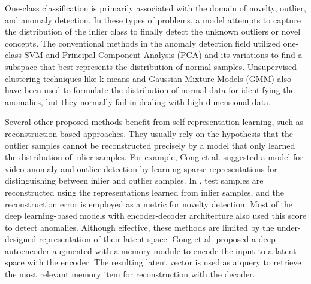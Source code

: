 \documentclass[10pt,twocolumn,letterpaper]{article}
\begin{document}
One-class classification is primarily associated with the domain of novelty, outlier, and anomaly detection. In these types of problems, a model attempts to capture the distribution of the inlier class to finally detect the unknown outliers or novel concepts. The conventional methods in the anomaly detection field utilized one-class SVM \cite{scholkopf2002learning, hayton2000support} and Principal Component Analysis (PCA) and its variations \cite{bishop2006pattern, hoffmann2007kernel} to find a subspace that best represents the distribution of normal samples. Unsupervised clustering techniques like k-means \cite{zimek2012survey} and Gaussian Mixture Models (GMM) \cite{xiong2011group} also have been used to formulate the distribution of normal data for identifying the anomalies, but they normally fail in dealing with high-dimensional data.

Several other proposed methods benefit from self-representation learning, such as reconstruction-based approaches. They usually rely on the hypothesis that the outlier samples cannot be reconstructed precisely by a model that only learned the distribution of inlier samples. For example, Cong et al. \cite{cong2011sparse} suggested a model for video anomaly and outlier detection by learning sparse representations for distinguishing between inlier and outlier samples. In \cite{xu2015learning, sabokrou2016video}, test samples are reconstructed using the representations learned from inlier samples, and the reconstruction error is employed as a metric for novelty detection. Most of the deep learning-based models with encoder-decoder architecture \cite{sakurada2014anomaly, zhai2016deep, zhou2017anomaly, zong2018deep, chong2017abnormal} also used this score to detect anomalies. Although effective, these methods are limited by the under-designed representation of their latent space. Gong et al. \cite{gong2019memorizing} proposed a deep autoencoder augmented with a memory module to encode the input to a latent space with the encoder. The resulting latent vector is used as a query to retrieve the most relevant memory item for reconstruction with the decoder. 
\end{document}
